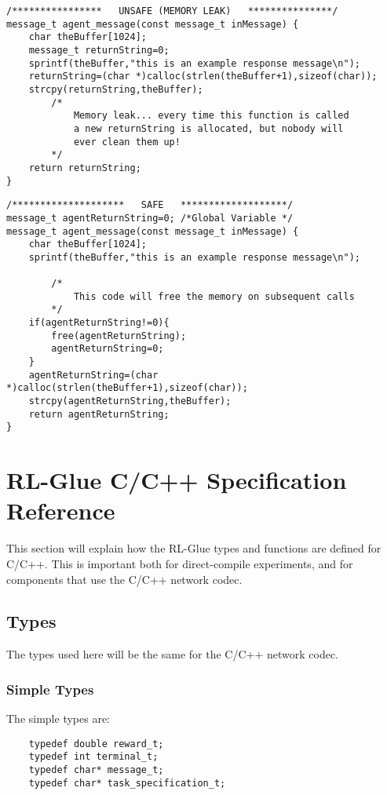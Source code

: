 \documentclass[11pt]{article}
\begin{document}
\begin{verbatim}
/****************   UNSAFE (MEMORY LEAK)   ***************/
message_t agent_message(const message_t inMessage) {
    char theBuffer[1024];
    message_t returnString=0;
    sprintf(theBuffer,"this is an example response message\n");
    returnString=(char *)calloc(strlen(theBuffer+1),sizeof(char));
    strcpy(returnString,theBuffer);
        /*
            Memory leak... every time this function is called
            a new returnString is allocated, but nobody will
            ever clean them up!
        */
    return returnString;
}
\end{verbatim}

\begin{verbatim}
/********************   SAFE   *******************/
message_t agentReturnString=0; /*Global Variable */	
message_t agent_message(const message_t inMessage) {
    char theBuffer[1024];
    sprintf(theBuffer,"this is an example response message\n");

        /*
            This code will free the memory on subsequent calls
        */
    if(agentReturnString!=0){
        free(agentReturnString);
        agentReturnString=0;
    }
    agentReturnString=(char *)calloc(strlen(theBuffer+1),sizeof(char));
    strcpy(agentReturnString,theBuffer);
    return agentReturnString;
}
\end{verbatim}


\section{RL-Glue C/C++ Specification Reference}
This section will explain how the RL-Glue types and functions are defined for C/C++.  This is important both for direct-compile experiments, and for components that
 use the C/C++ network codec.

\subsection{Types}
The types used here will be the same for the C/C++ network codec.

\subsubsection{Simple Types}
The simple types are:

\begin{verbatim}
    typedef double reward_t;
    typedef int terminal_t;
    typedef char* message_t;
    typedef char* task_specification_t;
\end{verbatim}
\end{document}
